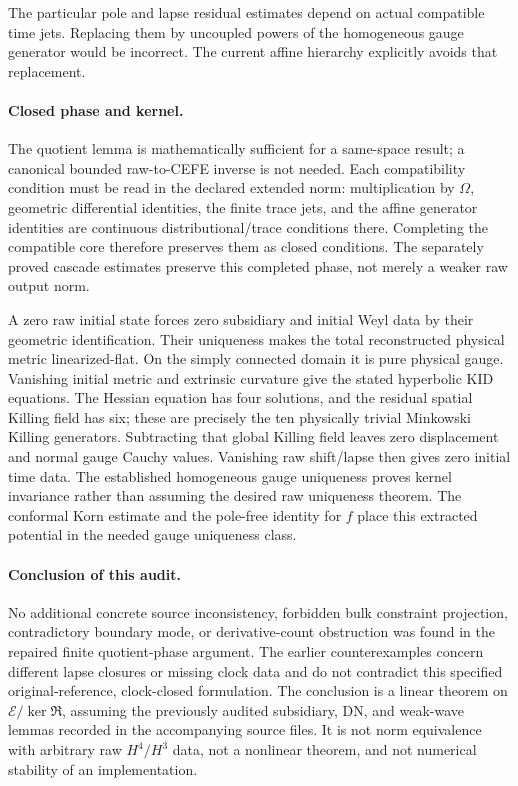 The particular pole and lapse residual estimates depend on actual
compatible time jets.  Replacing them by uncoupled powers of the
homogeneous gauge generator would be incorrect.  The current affine
hierarchy explicitly avoids that replacement.

\paragraph{Closed phase and kernel.}
The quotient lemma is mathematically sufficient for a same-space result;
a canonical bounded raw-to-CEFE inverse is not needed.  Each compatibility
condition must be read in the declared extended norm: multiplication by
$\Omega$, geometric differential identities, the finite trace jets, and
the affine generator identities are continuous distributional/trace
conditions there.  Completing the compatible core therefore preserves
them as closed conditions.  The separately proved cascade estimates
preserve this completed phase, not merely a weaker raw output norm.

A zero raw initial state forces zero subsidiary and initial Weyl data by
their geometric identification.  Their uniqueness makes the total
reconstructed physical metric linearized-flat.  On the simply connected
domain it is pure physical gauge.  Vanishing initial metric and extrinsic
curvature give the stated hyperbolic KID equations.  The Hessian equation
has four solutions, and the residual spatial Killing field has six; these
are precisely the ten physically trivial Minkowski Killing generators.
Subtracting that global Killing field leaves zero displacement and normal
gauge Cauchy values.  Vanishing raw shift/lapse then gives zero initial
time data.  The established homogeneous gauge uniqueness proves kernel
invariance rather than assuming the desired raw uniqueness theorem.
The conformal Korn estimate and the pole-free identity for $f$ place this
extracted potential in the needed gauge uniqueness class.

\paragraph{Conclusion of this audit.}
No additional concrete source inconsistency, forbidden bulk constraint
projection, contradictory boundary mode, or derivative-count obstruction
was found in the repaired finite quotient-phase argument.  The earlier
counterexamples concern different lapse closures or missing clock data
and do not contradict this specified original-reference, clock-closed
formulation.  The conclusion is a linear theorem on
$\mathcal E/\ker\mathfrak R$, assuming the previously audited subsidiary,
DN, and weak-wave lemmas recorded in the accompanying source files.
It is not norm equivalence with arbitrary raw $H^4/H^3$ data, not a
nonlinear theorem, and not numerical stability of an implementation.
